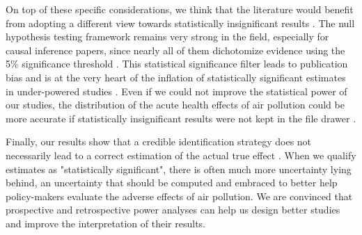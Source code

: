 \documentclass[12pt]{article}
\begin{document}
        On top of these specific considerations, we think that the literature would benefit from adopting a different view towards statistically insignificant results \citep{ziliak_cult_2008, wasserstein2016asa, mcshane2019abandon}. The null hypothesis testing framework remains very strong in the field, especially for causal inference papers, since nearly all of them dichotomize evidence using the 5\% significance threshold \citep{greenland2017invited}. This statistical significance filter leads to publication bias and is at the very heart of the inflation of statistically significant estimates in under-powered studies \citep{amrhein2019statistical, gelman2020regression, romer2020praise}. Even if we could not improve the statistical power of our studies, the distribution of the acute health effects of air pollution could be more accurate if statistically insignificant results were not kept in the file drawer \citep{hernan2022causal}.
        
        Finally, our results show that a credible identification strategy does not necessarily lead to a correct estimation of the actual true effect \citep{young2019consistency}. When we qualify estimates as "statistically significant", there is often much more uncertainty lying behind, an uncertainty that should be computed and embraced to better help policy-makers evaluate the adverse effects of air pollution. We are convinced that prospective and retrospective power analyses can help us design better studies and improve the interpretation of their results.


\setlength\bibsep{0pt}


\end{document}
